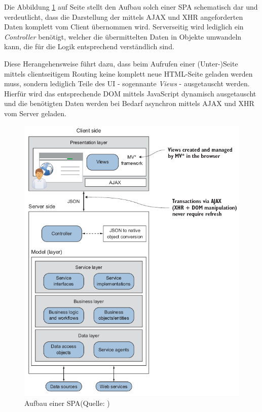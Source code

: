 \documentclass[a4paper,12pt,twoside]{scrreprt}
\begin{document}
Die Abbildung \ref{fig:spa-overview} auf Seite \pageref{fig:spa-overview} stellt den Aufbau solch einer \ac{SPA} schematisch dar und verdeutlicht, dass die Darstellung der mittels \acs{AJAX} und XHR angeforderten Daten komplett vom Client übernommen wird. Serverseitig wird lediglich ein \textit{Controller} benötigt, welcher die übermittelten Daten in Objekte umwandeln kann, die für die Logik entsprechend verständlich sind.

\medskip

Diese Herangehensweise führt dazu, dass beim Aufrufen einer (Unter-)Seite mittels clientseitigem Routing keine komplett neue HTML-Seite geladen werden muss, sondern lediglich Teile des \acl{UI} - sogennante \textit{Views} - ausgetauscht werden. Hierfür wird das entsprechende \ac{DOM} mittels JavaScript dynamisch ausgetauscht und die benötigten Daten werden bei Bedarf asynchron mittels \acs{AJAX} und XHR vom Server geladen. \parencite[][Seite 7]{scott_spa_2015}

\begin{figure}[ht]
    \centering
    \includegraphics[scale=0.60]{images/Scott_SPA-overview.png}
    \caption[Aufbau einer \acs{SPA}]{Aufbau einer \acs{SPA}\newline(Quelle: \cite[][Seite 6]{scott_spa_2015})}
    \label{fig:spa-overview}
\end{figure}
\end{document}
